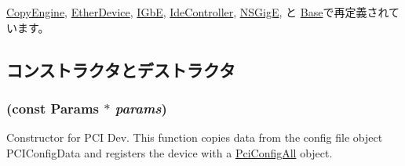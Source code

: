\hyperlink{classCopyEngine_a0b0580d58d6a0384646682653aefb97a}{CopyEngine}, \hyperlink{classEtherDevice_afcf43c7944288000e850f783bdd66b9d}{EtherDevice}, \hyperlink{classIGbE_ad27b5cfed87f35a483863a73336d8258}{IGbE}, \hyperlink{classIdeController_ac3896424d9bf2d8a838f1e2c38870d02}{IdeController}, \hyperlink{classNSGigE_a3d96e676dc626c146631b6fa53a9d823}{NSGigE}, と \hyperlink{classSinic_1_1Base_ae32fbee6dea75ffbb01b7d869c7bedad}{Base}で再定義されています。

\subsection{コンストラクタとデストラクタ}
\hypertarget{classPciDevice_ab3ecd08d152a6a949c1e6a2d48a9afd5}{
\subsubsection[{PciDevice}]{ (const {\bf Params} $\ast$ {\em params})}}
\label{classPciDevice_ab3ecd08d152a6a949c1e6a2d48a9afd5}
Constructor for PCI Dev. This function copies data from the config file object PCIConfigData and registers the device with a \hyperlink{classPciConfigAll}{PciConfigAll} object. 


